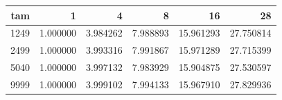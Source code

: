 \begin{tabular}{rrrrrr}
\toprule
tam & 1 & 4 & 8 & 16 & 28 \\
\midrule
1249 & 1.000000 & 3.984262 & 7.988893 & 15.961293 & 27.750814 \\
2499 & 1.000000 & 3.993316 & 7.991867 & 15.971289 & 27.715399 \\
5040 & 1.000000 & 3.997132 & 7.983929 & 15.904875 & 27.530597 \\
9999 & 1.000000 & 3.999102 & 7.994133 & 15.967910 & 27.829936 \\
\bottomrule
\end{tabular}
